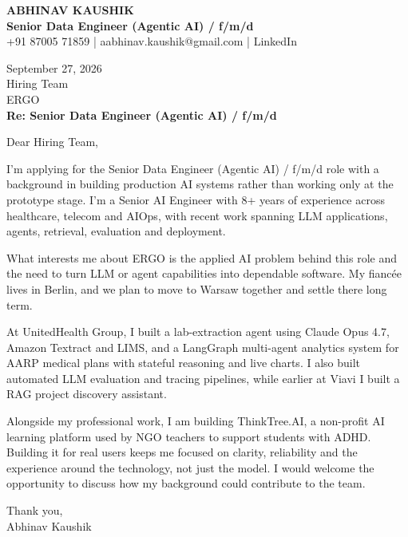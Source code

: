 \documentclass[10pt,a4paper]{article}
\begin{document}
\begin{center}
{\Large\bfseries ABHINAV KAUSHIK}\\[2pt]
{\bfseries Senior Data Engineer (Agentic AI) / f/m/d}\\[2pt]
+91 87005 71859 \quad | \quad aabhinav.kaushik@gmail.com \quad | \quad LinkedIn
\end{center}
\vspace{8pt}
September 27, 2026\\[6pt]
Hiring Team\\
ERGO\\[4pt]
\textbf{Re: Senior Data Engineer (Agentic AI) / f/m/d}

Dear Hiring Team,

I’m applying for the Senior Data Engineer (Agentic AI) / f/m/d role with a background in building production AI systems rather than working only at the prototype stage. I’m a Senior AI Engineer with 8+ years of experience across healthcare, telecom and AIOps, with recent work spanning LLM applications, agents, retrieval, evaluation and deployment.

What interests me about ERGO is the applied AI problem behind this role and the need to turn LLM or agent capabilities into dependable software. My fiancée lives in Berlin, and we plan to move to Warsaw together and settle there long term.

At UnitedHealth Group, I built a lab-extraction agent using Claude Opus 4.7, Amazon Textract and LIMS, and a LangGraph multi-agent analytics system for AARP medical plans with stateful reasoning and live charts. I also built automated LLM evaluation and tracing pipelines, while earlier at Viavi I built a RAG project discovery assistant.

Alongside my professional work, I am building ThinkTree.AI, a non-profit AI learning platform used by NGO teachers to support students with ADHD. Building it for real users keeps me focused on clarity, reliability and the experience around the technology, not just the model. I would welcome the opportunity to discuss how my background could contribute to the team.

Thank you,\\
Abhinav Kaushik
\end{document}
